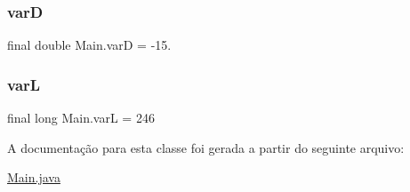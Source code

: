 \subsubsection{\texorpdfstring{varD}{varD}}
{\footnotesize\ttfamily final double Main.\+varD = -\/15.\hspace{0.3cm}{\ttfamily [static]}}

\mbox{\label{classMain_ae9ca95a4f1cfc8a167b4afd7af44b17e}} 
\subsubsection{\texorpdfstring{varL}{varL}}
{\footnotesize\ttfamily final long Main.\+varL = 246\hspace{0.3cm}{\ttfamily [static]}}



A documentação para esta classe foi gerada a partir do seguinte arquivo\+:\begin{DoxyCompactItemize}
\item 
\hyperlink{Main_8java}{Main.\+java}\end{DoxyCompactItemize}
